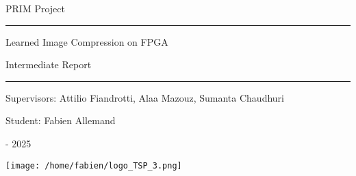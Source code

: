 \thispagestyle{empty}
\begin{center}

\vspace*{2.5cm}

{\fontsize{30}{30}\selectfont PRIM Project}

\rule{\textwidth}{1pt}

\medskip

{\fontsize{22}{22}\selectfont Learned Image Compression on FPGA}

{\fontsize{18}{18}\selectfont Intermediate Report}

\rule{\textwidth}{1pt}

\medskip

{\fontsize{18}{18}\selectfont Supervisors: Attilio Fiandrotti, Alaa Mazouz, Sumanta Chaudhuri}

\medskip

{\fontsize{18}{18}\selectfont Student: Fabien Allemand}

\medskip

{\fontsize{14}{14} - 2025}

\vspace*{2.5cm}

\texttt{[image: /home/fabien/logo\_TSP\_3.png]}

\vfill

\end{center}